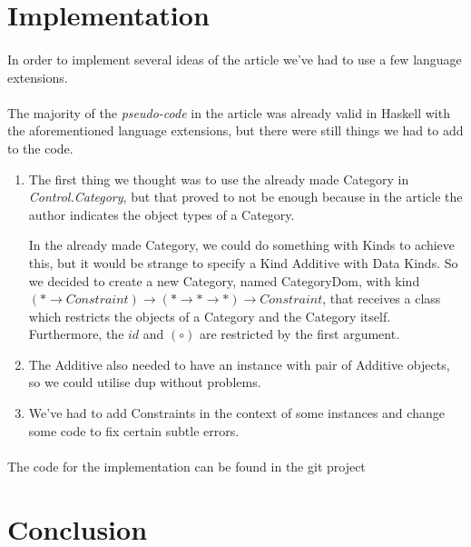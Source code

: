 \documentclass[11pt,a4]{article}
\newcommand{\Conid}[1]{\mathit{#1}}
\newcommand{\Varid}[1]{\mathit{#1}}
\theoremstyle{definition}
\theoremstyle{Definition}
\theoremstyle{Definition}
\begin{document}
\section{Implementation}
	\paragraph{} In order to implement several ideas of the article we've had to use a few language extensions.
	\paragraph{} The majority of the \textit{pseudo-code} in the article was already valid in Haskell with the aforementioned language extensions, but there were still things we had to add to the code.
	\begin{enumerate}
		\item 
		The first thing we thought was to use the already made Category in \textit{Control.Category}, but that proved to not be enough because in the article the author indicates the object types of a Category.
        
		In the already made Category, we could do something with Kinds to achieve this, but it would be strange to specify a Kind Additive with Data Kinds. So we decided to create a new Category, named CategoryDom, with kind \ensuremath{(\mathbin{*}\rightarrow \Conid{Constraint})\rightarrow (\mathbin{*}\rightarrow \mathbin{*}\rightarrow \mathbin{*})\rightarrow \Conid{Constraint}}, that receives a class which restricts the objects of a Category and the Category itself. Furthermore, the \ensuremath{\Varid{id}} and \ensuremath{(\mathbin{\circ})} are restricted by the first argument.
		\item
		The Additive also needed to have an instance with pair of Additive objects, so we could utilise dup without problems.
		\item 
		We've had to add Constraints in the context of some instances and change some code to fix certain subtle errors.
	\end{enumerate}
	\paragraph{} The code for the implementation can be found in the git project\cite{project}
	
	
	\newpage

	\section{Conclusion}
\end{document}
